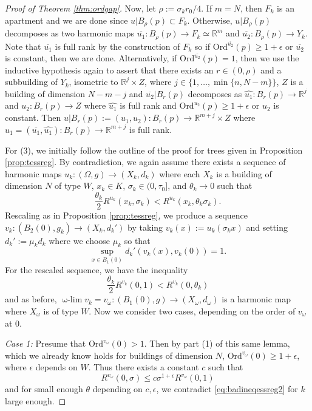 \documentclass[12pt]{amsart}
\theoremstyle{definition}
\numberwithin{equation}{section}
\newcommand{\R}{\mathbb R}
\newcommand\wlim{\mathop{\mbox{$\omega$-$\lim$}}}
\begin{document}
\begin{proof}[Proof of Theorem \ref{thm:ordgap}]
Now, let  $\rho:=\sigma_k r_0/4$.   If $m=N$, then $F_k$ is an apartment and we are done since  $u|{B_\rho(p)} \subset F_k$.  Otherwise, $u|{B_\rho(p)}$ decomposes as two harmonic maps $\overline {u_1}:B_\rho(p) \to F_k \simeq \R^{m}$ and $\overline{ u_2}:B_\rho(p) \to Y_k$. Note that $\overline{u_1}$ is full rank by the construction of $F_k$ so if $\text{Ord}^{\overline{u_2}}(p)\geq 1+\epsilon$ or $\overline {u_2}$ is constant, then we are done.  
Alternatively, if $\text{Ord}^{\overline{u_2}}(p)=1$, then we use the inductive hypothesis again to assert that there exists an $r \in (0,\rho)$ and a subbuilding of $Y_k$, isometric to $\R^{j} \times Z$, where $j \in \{1, \dots, \min\{n, N-m\}\}$, $Z$ is a building of dimension $N-m-j$ and $\overline{ u_2}|B_r(p)$  decomposes as $\widehat{ u_1}:B_r(p) \rightarrow \R^{j}$ and ${ u}_2:B_r(p) \rightarrow Z$ where $\widehat {u_1}$ is full rank and $\text{Ord}^{{u}_2}(p)\geq 1+\epsilon$ or $u_2$ is constant. Then $u|B_r(p):=(u_1, u_2):B_r(p) \to \R^{m+j} \times Z$ where $u_1=(\overline{u_1}, \widehat{u_1}):B_r(p) \to \R^{m+j}$ is full rank.



For (3), we initially follow the outline of the proof for trees given in Proposition \ref{prop:tessreg}. By contradiction, we again assume there exists  a sequence of harmonic maps $u_k:(\Omega,g)\to (X_k,d_k)$ where each $X_k$ is a building of dimension $N$ of type $W$,  $x_k\in K$, $\sigma_k\in(0,\tau_0]$, and $\theta_k \to 0$ such that
\[
\frac{\theta_k}2R^{u_k}(x_k,\sigma_k) <R^{u_k}(x_k,\theta_k\sigma_k).
\]
Rescaling as in Proposition \ref{prop:tessreg}, we produce a sequence $v_k:(B_2(0),g_k)\to (X_k,d_k')$ by taking $v_k(x):= u_k(\sigma_k x)$ and setting $d_k' := \mu_k d_k$ where we choose $\mu_k$ so that 
\begin{equation} \label{eq:sup=1}
\sup_{x \in B_1(0)}d_k'(v_k(x),v_k(0))=1.
\end{equation}
  For the rescaled sequence, we have the inequality
\begin{equation}\label{eq:badineqessreg2}
\frac{\theta_k}2R^{v_k}(0,1) <R^{v_k}(0,\theta_k)
\end{equation}and as before, $\wlim v_k=v_\omega:(B_1(0),g) \to (X_\omega, d_\omega)$ is a harmonic map where $X_\omega$ is of type $W$. Now we consider two cases, depending on the order of $v_\omega$ at $0$.

\emph{Case 1:} Presume that $\text{Ord}^{v_\omega}(0)>1$. Then by part (1) of this same lemma, which we already know holds for buildings of dimension $N$, $\text{Ord}^{v_\omega}(0)\geq 1+ \epsilon$, where $\epsilon$ depends on $W$. Thus there exists a constant $c$ such that
\[
R^{v_\omega}(0, \sigma) \leq c \sigma^{1+\epsilon}R^{v_\omega}(0,1)
\] and for small enough $\theta$ depending on $c,\epsilon$, we contradict \eqref{eq:badineqessreg2} for $k$ large enough.


\end{proof}
\end{document}
